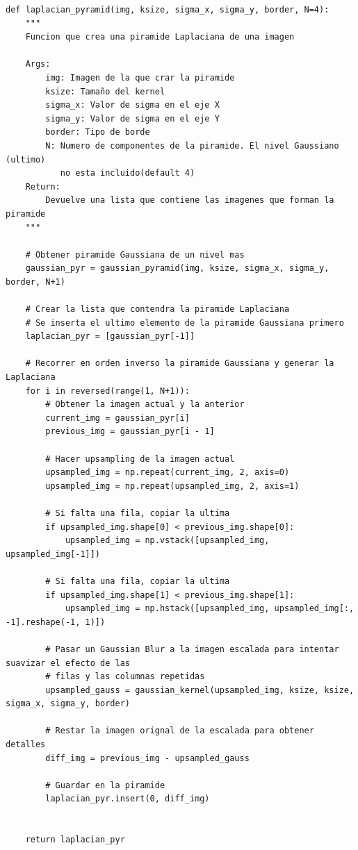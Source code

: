 \documentclass[11pt,a4paper]{article}
\begin{document}
\begin{lstlisting}[caption={Función que crea una pirámide Laplaciana.},label={alg:laplacian-pyramid}]
def laplacian_pyramid(img, ksize, sigma_x, sigma_y, border, N=4):
    """
    Funcion que crea una piramide Laplaciana de una imagen

    Args:
        img: Imagen de la que crar la piramide
        ksize: Tamaño del kernel
        sigma_x: Valor de sigma en el eje X
        sigma_y: Valor de sigma en el eje Y
        border: Tipo de borde
        N: Numero de componentes de la piramide. El nivel Gaussiano (ultimo)
           no esta incluido(default 4)
    Return:
        Devuelve una lista que contiene las imagenes que forman la piramide
    """

    # Obtener piramide Gaussiana de un nivel mas
    gaussian_pyr = gaussian_pyramid(img, ksize, sigma_x, sigma_y, border, N+1)

    # Crear la lista que contendra la piramide Laplaciana
    # Se inserta el ultimo elemento de la piramide Gaussiana primero
    laplacian_pyr = [gaussian_pyr[-1]]

    # Recorrer en orden inverso la piramide Gaussiana y generar la Laplaciana
    for i in reversed(range(1, N+1)):
        # Obtener la imagen actual y la anterior
        current_img = gaussian_pyr[i]
        previous_img = gaussian_pyr[i - 1]

        # Hacer upsampling de la imagen actual
        upsampled_img = np.repeat(current_img, 2, axis=0)
        upsampled_img = np.repeat(upsampled_img, 2, axis=1)

        # Si falta una fila, copiar la ultima
        if upsampled_img.shape[0] < previous_img.shape[0]:
            upsampled_img = np.vstack([upsampled_img, upsampled_img[-1]])

        # Si falta una fila, copiar la ultima
        if upsampled_img.shape[1] < previous_img.shape[1]:
            upsampled_img = np.hstack([upsampled_img, upsampled_img[:, -1].reshape(-1, 1)])

        # Pasar un Gaussian Blur a la imagen escalada para intentar suavizar el efecto de las
        # filas y las columnas repetidas
        upsampled_gauss = gaussian_kernel(upsampled_img, ksize, ksize, sigma_x, sigma_y, border)

        # Restar la imagen orignal de la escalada para obtener detalles
        diff_img = previous_img - upsampled_gauss

        # Guardar en la piramide
        laplacian_pyr.insert(0, diff_img)


    return laplacian_pyr
\end{lstlisting}
\end{document}
